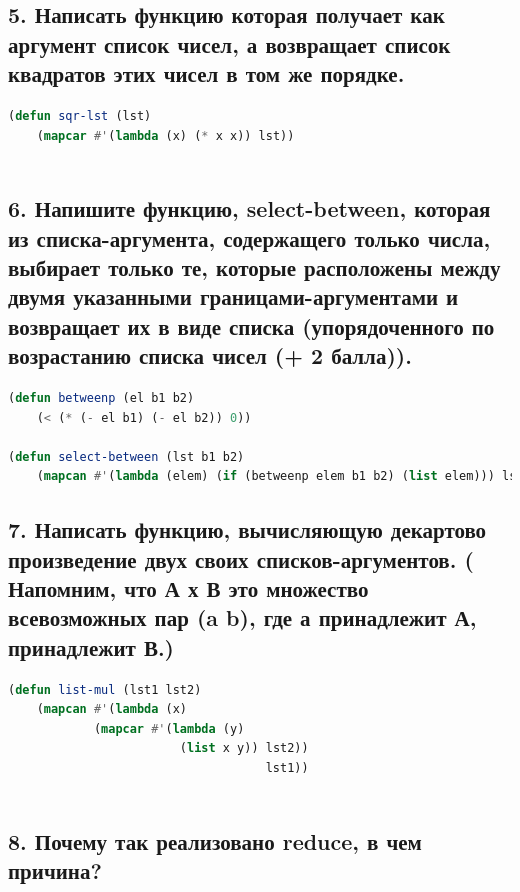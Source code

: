 \documentclass[12pt]{report}
\begin{document}
\subsection*{5. Написать функцию которая получает как аргумент список чисел, а возвращает список
	квадратов этих чисел в том же порядке.}

\begin{lstlisting}[label=6xd, caption=Решение задания №5, language=lisp]
(defun sqr-lst (lst) 
	(mapcar #'(lambda (x) (* x x)) lst))
	
\end{lstlisting}

\newpage
\subsection*{6.  Напишите функцию, select-between, которая из списка-аргумента, содержащего только
	числа, выбирает только те, которые расположены между двумя указанными границами-аргументами и возвращает их в виде списка (упорядоченного по возрастанию списка чисел
	(+ 2 балла)).}

\begin{lstlisting}[label=6xd, caption=Решение задания №6, language=lisp]
(defun betweenp (el b1 b2)
	(< (* (- el b1) (- el b2)) 0))

(defun select-between (lst b1 b2)
	(mapcan #'(lambda (elem) (if (betweenp elem b1 b2) (list elem))) lst))

\end{lstlisting}

\subsection*{7. Написать функцию, вычисляющую декартово произведение двух своих списков-аргументов. ( Напомним, что А х В это множество всевозможных пар (a b), где а
	принадлежит А, принадлежит В.)}

\begin{lstlisting}[label=6xd, caption=Решение задания №7, language=lisp]	
(defun list-mul (lst1 lst2)
	(mapcan #'(lambda (x)
			(mapcar #'(lambda (y)
						(list x y)) lst2))
									lst1))
	
\end{lstlisting}

\subsection*{8. Почему так реализовано reduce, в чем причина?}
\end{document}
